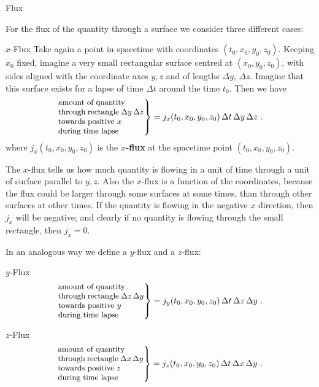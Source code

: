 \documentclass[a4paper,12pt,%
onecolumn,oneside,titlepage,%
british%
]{memoir}
\newcommand*{\incr}{\Delta}%
\renewcommand*{\|}[1][]{\nonscript\:#1\vert\nonscript\:\mathopen{}}
\newcommand*{\yto}{t_{0}}
\newcommand*{\yxo}{x_{0}}
\newcommand*{\yyo}{y_{0}}
\newcommand*{\yzo}{z_{0}}
\newcommand*{\Dt}{\incr t}
\newcommand*{\Dx}{\incr x}
\newcommand*{\Dy}{\incr y}
\newcommand*{\Dz}{\incr z}
\begin{document}
\medskip


\begin{warning}
  Flux
\end{warning}

For the flux of the quantity through a surface we consider three different cases:
\begin{definition}{$x$-Flux}
  Take again a point in spacetime with coordinates $(\yto,\yxo,\yyo,\yzo)$. Keeping $\yxo$ fixed, imagine a very small rectangular surface centred at $(\yxo,\yyo,\yzo)$, with sides aligned with the coordinate axes $y,z$ and of lengths $\Dy$, $\Dz$. Imagine that this surface exists for a lapse of time $\Dt$ around the time $\yto$. Then we have
  \begin{equation}
    \label{eq:xflux_expl}
    \left.\parbox[c]{10em}{\small amount of quantity\\ through rectangle $\Dy\,\Dz$\\ towards positive $x$\\during time lapse }\right\} = 
    j_{x}(\yto,\yxo,\yyo,\yzo)\, \Dt\, \Dy\, \Dz \ .
  \end{equation}
  where $j_{x}(\yto,\yxo,\yyo,\yzo)$ is the \textbf{$x$-flux} at the spacetime point $(\yto,\yxo,\yyo,\yzo)$.
\end{definition}
The $x$-flux tells us how much quantity is flowing in a unit of time through a unit of surface parallel to $y,z$. Also the $x$-flux is a function of the coordinates, because the flux could be larger through some surfaces at some times, than through other surfaces at other times. If the quantity is flowing in the negative $x$ direction, then $j_{x}$ will be negative; and clearly if no quantity is flowing through the small rectangle, then $j_{x}=0$.

In an analogous way we define a $y$-flux and a $z$-flux:

\begin{definition}{$y$-Flux}
  \begin{equation}
    \label{eq:yflux_expl}
    \left.\parbox[c]{10em}{\small amount of quantity\\ through rectangle $\Dz\,\Dy$\\ towards positive $y$\\during time lapse }\right\} = 
    j_{y}(\yto,\yxo,\yyo,\yzo)\, \Dt\, \Dz\, \Dy \ .
  \end{equation}
\end{definition}
\begin{definition}{$z$-Flux}
  \begin{equation}
    \label{eq:zflux_expl}
    \left.\parbox[c]{10em}{\small amount of quantity\\ through rectangle $\Dx\,\Dy$\\ towards positive $z$\\during time lapse }\right\} = 
    j_{z}(\yto,\yxo,\yyo,\yzo)\, \Dt\, \Dx\, \Dy \ .
  \end{equation}
\end{definition}
\end{document}
